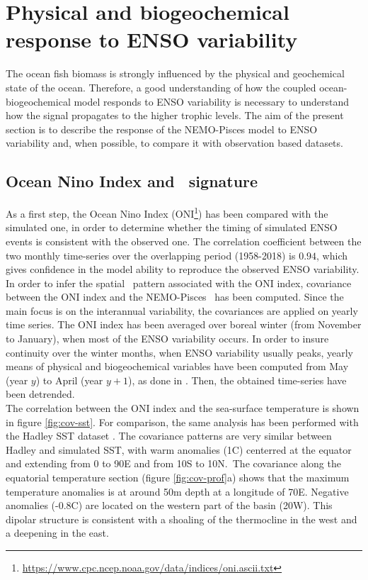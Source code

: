 \section{Physical and biogeochemical response to ENSO variability}
\label{sec:pisces}

The ocean fish biomass is strongly influenced by the physical and geochemical state of the ocean. Therefore, a good understanding of how the coupled ocean-biogeochemical model 
responds to ENSO variability is necessary to understand how the signal propagates to the higher trophic levels. 
The aim of the present section is to describe the response of the NEMO-Pisces model to ENSO variability and, when possible, to compare it with observation based datasets.\\

\subsection{Ocean Nino Index and \sst\ signature}
\label{sec:sst}

As a first step, the Ocean Nino Index (ONI\footnote{\url{https://www.cpc.ncep.noaa.gov/data/indices/oni.ascii.txt}}) has been compared with the simulated one, in order to determine whether the timing of simulated ENSO events is consistent with the observed one. The correlation coefficient between the two monthly time-series over the overlapping period (1958-2018) is $0.94$, which gives confidence in the model ability to reproduce the observed ENSO variability. \\

In order to infer the spatial \sst\ pattern associated with the ONI index, covariance between the ONI index and the NEMO-Pisces \sst\ has been computed. Since the main focus is on the interannual variability, the covariances are applied on yearly time series. The ONI index has been averaged over boreal winter (from November to January), when most of the ENSO variability occurs. In order to insure continuity over the winter months, when ENSO variability usually peaks, yearly means of physical and biogeochemical variables have been computed from May (year $y$) to April (year $y + 1$), as done in \cite{racaultImpactNinoVariability2017}. Then, the obtained time-series have been detrended.\\

The correlation between the ONI index and the sea-surface temperature is shown in figure \ref{fig:cov-sst}. For comparison, the same analysis has been performed with the Hadley SST dataset \citep{raynerGlobalAnalysesSea2003}.
The covariance patterns are very similar between Hadley and simulated SST, with warm anomalies (1\degree C) centerred at the equator and extending from 0 to 90\degree E and from 10\degree S to 10N.\ 
The covariance along the equatorial temperature section (figure \ref{fig:cov-prof}a) shows that the maximum temperature anomalies is at around 50m depth at a longitude of 70\degree E. Negative anomalies (-0.8\degree C) are located on the western part of the basin (20\degree W). This dipolar structure is consistent with a shoaling of the thermocline in the west and a deepening in the east.\\

